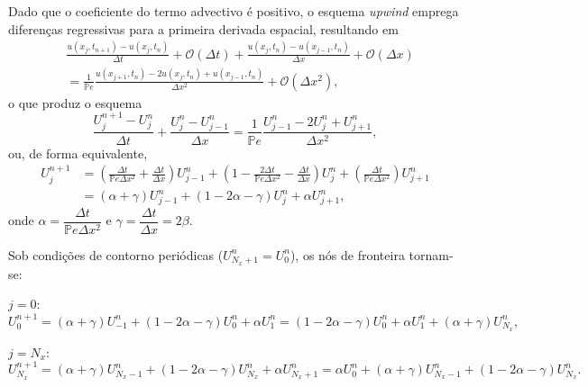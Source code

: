 \documentclass[12pt, a4paper]{article}
\newcommand{\bb}[1]{\mathbb{#1}}
\newcommand{\D}[1]{\Delta#1}
\renewcommand{\O}[1]{\mathcal{O} (#1)}
\begin{document}
    Dado que o coeficiente do termo advectivo é positivo, o esquema \textit{upwind} emprega diferenças regressivas para a primeira derivada espacial, resultando em
    \begin{equation}
        \begin{split}
            &\frac{u(x_j,t_{n+1})-u(x_j,t_n)}{\D{t}} + \O{\D{t}} + \frac{u(x_{j},t_n)-u(x_{j-1},t_n)}{\D{x}} + \O{\D{x}}
            \\&= \frac{1}{\bb{P}e} \frac{u(x_{j+1},t_n)-2u(x_j,t_n)+u(x_{j-1},t_n)}{\D{x}^2} + \O{\D{x}^2},
        \end{split}
    \end{equation}
    o que produz o esquema
    \begin{equation}
        \frac{U_j^{n+1}-U_j^n}{\D{t}} + \frac{U_j^n-U_{j-1}^n}{\D{x}} = \frac{1}{\bb{P}e} \frac{U_{j-1}^n-2U_j^n+U_{j+1}^n}{\D{x}^2},
    \end{equation}
    ou, de forma equivalente,
    \begin{equation}
        \begin{split}
            U_j^{n+1} &= \left(\frac{\D{t}}{\bb{P}e\D{x}^2}+\frac{\D{t}}{\D{x}}\right)U_{j-1}^n + \left(1-\frac{2\D{t}}{\bb{P}e\D{x}^2}-\frac{\D{t}}{\D{x}}\right)U_j^n + \left(\frac{\D{t}}{\bb{P}e\D{x}^2}\right)U_{j+1}^n\\[.2cm]
            &= (\alpha+\gamma)U_{j-1}^n + (1-2\alpha-\gamma)U_j^n + \alpha U_{j+1}^n,
        \end{split}
    \end{equation}
    onde $\alpha = \dfrac{\D{t}}{\bb{P}e\D{x^2}}$ e $\gamma = \dfrac{\D{t}}{\D{x}} = 2\beta$.

    \vspace{.3cm}

    Sob condições de contorno periódicas ($U_{N_x+1}^n = U_0^n$), os nós de fronteira tornam-se:

    $j = 0$:
    \[U_0^{n+1} = (\alpha+\gamma)U_{-1}^n + (1-2\alpha-\gamma)U_0^n + \alpha U_{1}^n = (1-2\alpha-\gamma)U_0^n + \alpha U_{1}^n + (\alpha+\gamma)U_{N_x}^n,\]

    $j = N_x$:
    \[U_{N_x}^{n+1} = (\alpha+\gamma)U_{N_x-1}^n + (1-2\alpha-\gamma)U_{N_x}^n + \alpha U_{N_x+1}^n = \alpha U_{0}^n + (\alpha+\gamma)U_{N_x-1}^n + (1-2\alpha-\gamma)U_{N_x}^n.\]
\end{document}
